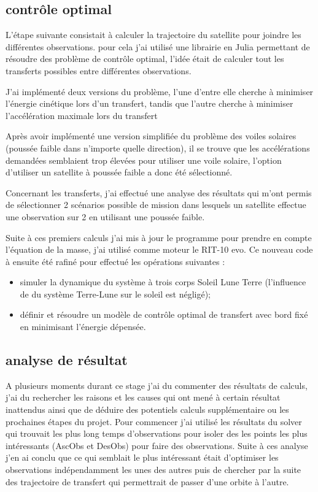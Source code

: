 \documentclass[12pt]{article} %
\begin{document}
		\subsection{contrôle optimal}
		
		L'étape suivante consistait à calculer la trajectoire du satellite pour joindre les différentes observations.
		pour cela j'ai utilisé une librairie en Julia permettant de résoudre des problème de contrôle optimal, l'idée était de calculer tout les transferts possibles entre différentes observations.
		
		J'ai implémenté deux versions du problème, l'une d'entre elle cherche à minimiser l'énergie cinétique lors d'un transfert, tandis que l'autre cherche à minimiser l'accélération maximale lors du transfert
		
		Après avoir implémenté une version simplifiée du problème des voiles solaires (poussée faible dans n'importe quelle direction), il se trouve que les accélérations demandées semblaient trop élevées pour utiliser une voile solaire, l'option d'utiliser un satellite à poussée faible a donc été sélectionné.
		
		Concernant les transferts, j'ai effectué une analyse des résultats qui m'ont permis de sélectionner 2 scénarios possible de mission dans lesquels un satellite effectue une observation sur 2 en utilisant une poussée faible.
		
		Suite à ces premiers calculs j'ai mis à jour le programme pour prendre en compte l'équation de la masse, j'ai utilisé comme moteur le RIT-10 evo. Ce nouveau code à ensuite été rafiné pour effectué les opérations suivantes : 
		
		\begin{itemize}
			\item simuler la dynamique du système à trois corps Soleil Lune Terre (l'influence de du système Terre-Lune sur le soleil est négligé);
			\item définir et résoudre un modèle de contrôle optimal de transfert avec bord fixé en minimisant l'énergie dépensée.
		\end{itemize}
		
		\subsection{analyse de résultat}
		
		A plusieurs moments durant ce stage j'ai du commenter des résultats de calculs, j'ai du rechercher les raisons et les causes qui ont mené à certain résultat inattendus ainsi que de déduire des potentiels calculs supplémentaire ou les prochaines étapes du projet. Pour commencer j'ai utilisé les résultats du solver qui trouvait les plus long temps d'observations pour isoler des les points les plus intéressants  (\gls{AscObs} et \gls{DesObs}) pour faire des observations. Suite à ces analyse j'en ai conclu que ce qui semblait le plus intéressant était d'optimiser les observations indépendamment les unes des autres puis de chercher par la suite des trajectoire de transfert qui permettrait de passer d'une orbite à l'autre.
		
\end{document}

